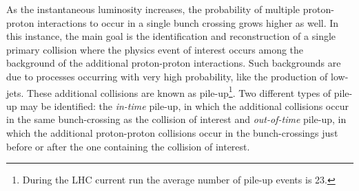 As the instantaneous luminosity increases, the probability of multiple proton-proton interactions to occur in a single bunch crossing grows higher as well. In this instance, the main goal is the identification and reconstruction of a single primary collision where the physics event of interest occurs among the background of the additional proton-proton interactions. Such backgrounds are due to processes occurring with very high probability, like the production of low-\pt jets. These additional collisions are known as pile-up\footnote{During the LHC current run the average number of pile-up events is 23.}. Two different types of pile-up may be identified: the \emph{in-time} pile-up, in which the additional collisions occur in the same bunch-crossing as the collision of interest and \emph{out-of-time} pile-up, in which the additional proton-proton collisions occur in the bunch-crossings just before or after the one containing the collision of interest.










